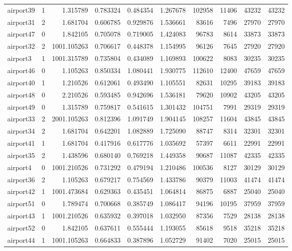 \begin{longtable}{|l|r|r|r|r|r|r|r|r|r|}
airport39 & 1 & 1.315789 & 0.783324 & 0.484354 & 1.267678 & 102958 & 11406 & 43232 & 43232 \\
airport31 & 2 & 1.681704 & 0.606785 & 0.929876 & 1.536661 & 83616 & 7496 & 27970 & 27970 \\
airport47 & 0 & 1.842105 & 0.705078 & 0.719005 & 1.424083 & 96783 & 8614 & 33873 & 33873 \\
airport32 & 2 & 1001.105263 & 0.706617 & 0.448378 & 1.154995 & 96126 & 7645 & 27920 & 27920 \\
airport3 & 1 & 1001.315789 & 0.735804 & 0.434089 & 1.169893 & 100622 & 8083 & 30235 & 30235 \\
airport46 & 0 & 1.105263 & 0.850334 & 1.080441 & 1.930775 & 112610 & 12400 & 47659 & 47659 \\
airport40 & 1 & 1.210526 & 0.612061 & 0.493490 & 1.105551 & 82631 & 10295 & 39183 & 39183 \\
airport48 & 0 & 2.210526 & 0.593485 & 0.942696 & 1.536181 & 79620 & 10902 & 43205 & 43205 \\
airport49 & 0 & 1.315789 & 0.759817 & 0.541615 & 1.301432 & 104751 & 7991 & 29319 & 29319 \\
airport33 & 2 & 2001.105263 & 0.812396 & 1.091749 & 1.904145 & 108257 & 11604 & 43845 & 43845 \\
airport34 & 2 & 1.681704 & 0.642201 & 1.082889 & 1.725090 & 88747 & 8314 & 32301 & 32301 \\
airport41 & 1 & 1.681704 & 0.417916 & 0.617776 & 1.035692 & 57397 & 6611 & 22991 & 22991 \\
airport35 & 2 & 1.438596 & 0.680140 & 0.769218 & 1.449358 & 90687 & 11087 & 42335 & 42335 \\
airport4 & 0 & 1001.210526 & 0.731292 & 0.479194 & 1.210486 & 100536 & 8127 & 30129 & 30129 \\
airport36 & 2 & 1.105263 & 0.679217 & 0.754569 & 1.433786 & 90379 & 11003 & 41474 & 41474 \\
airport42 & 1 & 1001.473684 & 0.629363 & 0.435451 & 1.064814 & 86875 & 6887 & 25040 & 25040 \\
airport51 & 0 & 1.789474 & 0.700668 & 0.385749 & 1.086417 & 94196 & 10195 & 37959 & 37959 \\
airport43 & 1 & 1001.210526 & 0.635932 & 0.397018 & 1.032950 & 87356 & 7529 & 28138 & 28138 \\
airport52 & 0 & 1.842105 & 0.637611 & 0.555444 & 1.193055 & 85618 & 9518 & 35218 & 35218 \\
airport44 & 1 & 1001.105263 & 0.664833 & 0.387896 & 1.052729 & 91402 & 7020 & 25015 & 25015 \\

\end{longtable}
